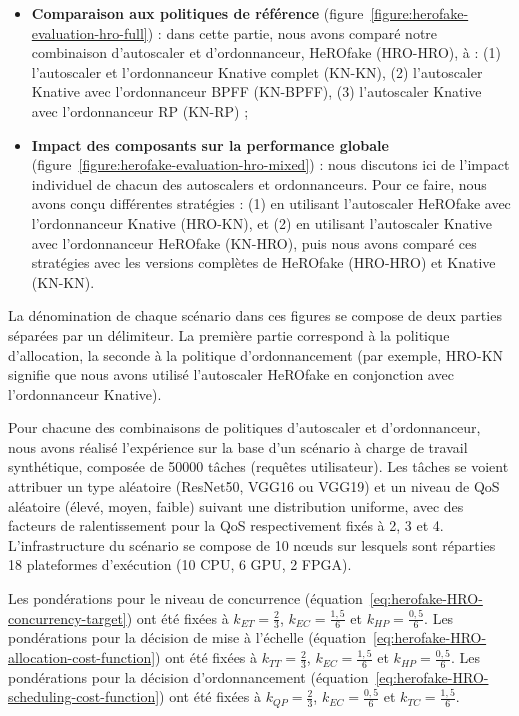 \begin{itemize}
    \item \textbf{Comparaison aux politiques de référence} (figure~\ref{figure:herofake-evaluation-hro-full}) : dans cette partie, nous avons comparé notre combinaison d'autoscaler et d'ordonnanceur, HeROfake (HRO-HRO), à : (1) l'autoscaler et l'ordonnanceur Knative complet (KN-KN), (2) l'autoscaler Knative avec l'ordonnanceur \gls{BPFF} (KN-BPFF), (3) l'autoscaler Knative avec l'ordonnanceur RP (KN-RP) ;
    \item \textbf{Impact des composants sur la performance globale} (figure~\ref{figure:herofake-evaluation-hro-mixed}) : nous discutons ici de l'impact individuel de chacun des autoscalers et ordonnanceurs. Pour ce faire, nous avons conçu différentes stratégies : (1) en utilisant l'autoscaler HeROfake avec l'ordonnanceur Knative (HRO-KN), et (2) en utilisant l'autoscaler Knative avec l'ordonnanceur HeROfake (KN-HRO), puis nous avons comparé ces stratégies avec les versions complètes de HeROfake (HRO-HRO) et Knative (KN-KN).
\end{itemize}

La dénomination de chaque scénario dans ces figures se compose de deux parties séparées par un délimiteur. La première partie correspond à la politique d'allocation, la seconde à la politique d'ordonnancement (par exemple, HRO-KN signifie que nous avons utilisé l'autoscaler HeROfake en conjonction avec l'ordonnanceur Knative).

Pour chacune des combinaisons de politiques d'autoscaler et d'ordonnanceur, nous avons réalisé l'expérience sur la base d'un scénario à charge de travail synthétique, composée de 50000 tâches (requêtes utilisateur). Les tâches se voient attribuer un type aléatoire (ResNet50, VGG16 ou VGG19) et un niveau de \gls{QoS} aléatoire (élevé, moyen, faible) suivant une distribution uniforme, avec des facteurs de ralentissement pour la \gls{QoS} respectivement fixés à 2, 3 et 4. L'infrastructure du scénario se compose de 10 nœuds sur lesquels sont réparties 18 plateformes d'exécution (10 \gls{CPU}, 6 \gls{GPU}, 2 \gls{FPGA}).

Les pondérations pour le niveau de concurrence (équation~\ref{eq:herofake-HRO-concurrency-target}) ont été fixées à $k_{ET} = \frac{2}{3}$, $k_{EC} = \frac{1,5}{6}$ et $k_{HP} = \frac{0,5}{6}$. Les pondérations pour la décision de mise à l'échelle (équation~\ref{eq:herofake-HRO-allocation-cost-function}) ont été fixées à $k_{TT} = \frac{2}{3}$, $k_{EC} = \frac{1,5}{6}$ et $k_{HP} = \frac{0,5}{6}$. Les pondérations pour la décision d'ordonnancement (équation~\ref{eq:herofake-HRO-scheduling-cost-function}) ont été fixées à $k_{QP} = \frac{2}{3}$, $k_{EC} = \frac{0,5}{6}$ et $k_{TC} = \frac{1,5}{6}$.

